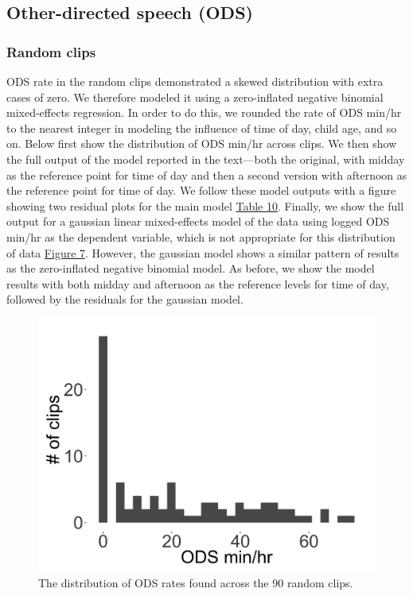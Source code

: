 \documentclass[floatsintext,man]{apa6}
\theoremstyle{definition}
\theoremstyle{definition}
\theoremstyle{definition}
\theoremstyle{remark}
\begin{document}
\subsection{Other-directed speech (ODS)}\label{models-ods}

\subsubsection{Random clips}\label{models-ods-random}

ODS rate in the random clips demonstrated a skewed distribution with
extra cases of zero. We therefore modeled it using a zero-inflated
negative binomial mixed-effects regression. In order to do this, we
rounded the rate of ODS min/hr to the nearest integer in modeling the
influence of time of day, child age, and so on. Below first show the
distribution of ODS min/hr across clips. We then show the full output of
the model reported in the text---both the original, with midday as the
reference point for time of day and then a second version with afternoon
as the reference point for time of day. We follow these model outputs
with a figure showing two residual plots for the main model
\protect\hyperlink{tab10}{Table 10}. Finally, we show the full output
for a gaussian linear mixed-effects model of the data using logged ODS
min/hr as the dependent variable, which is not appropriate for this
distribution of data \protect\hyperlink{fig7}{Figure 7}. However, the
gaussian model shows a similar pattern of results as the zero-inflated
negative binomial model. As before, we show the model results with both
midday and afternoon as the reference levels for time of day, followed
by the residuals for the gaussian model.

\begin{figure}

{\centering \includegraphics[width=0.4\linewidth]{www/ODS_random_distribution} 

}

\caption{The distribution of ODS rates found across the 90 random clips.}\label{fig:fig7}
\end{figure}
\end{document}
